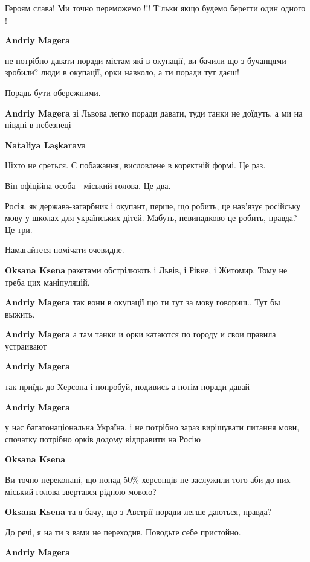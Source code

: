 \begin{itemize}
\begin{itemize}
Героям слава! Ми точно переможемо !!! Тiльки якщо будемо берегти один одного !

\textbf{Andriy Magera} 

не потрібно давати поради містам які в окупації, ви бачили що з бучанцями
зробили? люди в окупації, орки навколо, а ти поради тут даєш!

Порадь бути обережними.

\textbf{Andriy Magera} зі Львова легко поради давати, туди танки не доїдуть, а ми на півдні в небезпеці

\textbf{Nataliya Laşkarava} 

Ніхто не среться. Є побажання, висловлене в коректній формі. Це раз.

Він офіційна особа - міський голова. Це два.

Росія, як держава-загарбник і окупант, перше, що робить, це нав’язує російську
мову у школах для українських дітей. Мабуть, невипадково це робить, правда? Це
три.

Намагайтеся помічати очевидне.

\textbf{Oksana Ksena} ракетами обстрілюють і Львів, і Рівне, і Житомир. Тому не треба цих маніпуляцій.

\textbf{Andriy Magera} так вони в окупації що ти тут за мову говориш..
Тут бы выжить.

\textbf{Andriy Magera} а там танки и орки катаются по городу и свои правила устраивают


\textbf{Andriy Magera} 

так приїдь до Херсона і попробуй, подивись а потім поради давай

\textbf{Andriy Magera} 

у нас багатонаціональна Україна, і не потрібно зараз вирішувати питання мови,
спочатку потрібно орків додому відправити на Росію

\textbf{Oksana Ksena} 

Ви точно переконані, що понад 50\% херсонців не заслужили того аби до них
міський голова звертався рідною мовою?

\textbf{Oksana Ksena} та я бачу, що з Австрії поради легше даються, правда?

До речі, я на ти з вами не переходив. Поводьте себе пристойно.

\textbf{Andriy Magera} 


\end{itemize}
\end{itemize}
